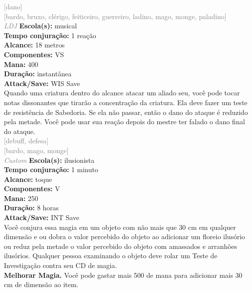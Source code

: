 \documentclass{RPG_Adventure}[2021/10/20]
\begin{document}
{\scriptsize \textcolor{gray}{[dano]\\}}
{\scriptsize \textcolor{gray}{[bardo, bruxo, clérigo, feiticeiro, guerreiro, ladino, mago, monge, paladino]\\}}
{\tiny \textcolor{gray}{\textit{LDJ}}}
{\small \t \textbf{Escola(s):} musical\\\t \textbf{Tempo conjuração:} 1 reação\\\t \textbf{Alcance:} 18 metros\\\t \textbf{Componentes:} VS\\\t \textbf{Mana:} 400\\\t \textbf{Duração:} instantânea\\\t \textbf{Attack/Save:} WIS Save\\}
{\normalsize Quando uma criatura dentro do alcance atacar um aliado seu, você pode tocar notas dissonantes que tirarão a concentração da criatura. Ela deve fazer um teste de resistência de Sabedoria. Se ela não passar, então o dano do ataque é reduzido pela metade. Você pode usar sua reação depois do mestre ter falado o dano final do ataque.\\}
{\scriptsize \textcolor{gray}{[debuff, defesa]\\}}
{\scriptsize \textcolor{gray}{[bardo, mago, monge]\\}}
{\tiny \textcolor{gray}{\textit{Custom}}}
{\small \t \textbf{Escola(s):} ilusionista\\\t \textbf{Tempo conjuração:} 1 minuto\\\t \textbf{Alcance:} toque\\\t \textbf{Componentes:} V\\\t \textbf{Mana:} 250\\\t \textbf{Duração:} 8 horas\\\t \textbf{Attack/Save:} INT Save\\}
{\normalsize Você conjura essa magia em um objeto com não mais que 30 cm em qualquer dimensão e ou dobra o valor percebido do objeto ao adicionar um floreio ilusório ou reduz pela metade o valor percebido do objeto com amassados e arranhões ilusórios. Qualquer pessoa examinando o objeto deve rolar um Teste de Investigação contra seu CD de magia.\\\t \textbf{Melhorar Magia.} Você pode gastar mais 500 de mana para adicionar mais 30 cm de dimensão ao item.\\}
\end{document}
